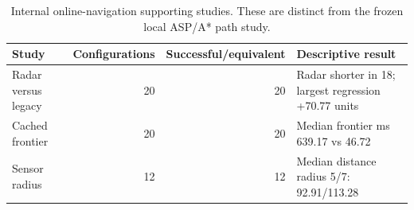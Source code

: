 \begin{table}[t]
\centering
\caption{Internal online-navigation supporting studies. These are distinct from the frozen local ASP/A* path study.}
\label{tab:supporting-final}
\begin{tabular}{lrrl}
\hline
Study & Configurations & Successful/equivalent & Descriptive result \\
\hline
Radar versus legacy & 20 & 20 & Radar shorter in 18; largest regression +70.77 units \\
Cached frontier & 20 & 20 & Median frontier ms 639.17 vs 46.72 \\
Sensor radius & 12 & 12 & Median distance radius 5/7: 92.91/113.28 \\
\hline
\end{tabular}
\end{table}
